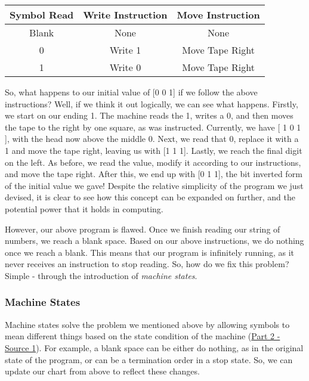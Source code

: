 \documentclass{article}
\begin{document}
\begin{center}
\begin{tabular}{||c c c||} 
 \hline
 Symbol Read & Write Instruction & Move Instruction\\ [0.5ex] 
 \hline\hline
 Blank & None & None\\ 
 \hline
 0 & Write 1 & Move Tape Right\\
 \hline
 1 & Write 0 & Move Tape Right\\
 \hline
\end{tabular}
\end{center}

\medskip\noindent So, what happens to our initial value of [0 0 1] if we follow the above instructions? Well, if we think it out logically, we can see what happens. Firstly, we start on our ending 1. The machine reads the 1, writes a 0, and then moves the tape to the right by one square, as was instructed. Currently, we have [ 1 0 1 ], with the head now above the middle 0. Next, we read that 0, replace it with a 1 and move the tape right, leaving us with [1 1 1]. Lastly, we reach the final digit on the left. As before, we read the value, modify it according to our instructions, and move the tape right. After this, we end up with [0 1 1], the bit inverted form of the initial value we gave! Despite the relative simplicity of the program we just devised, it is clear to see how this concept can be expanded on further, and the potential power that it holds in computing.

\medskip\noindent However, our above program is flawed. Once we finish reading our string of numbers, we reach a blank space. Based on our above instructions, we do nothing once we reach a blank. This means that our program is infinitely running, as it never receives an instruction to stop reading. So, how do we fix this problem? Simple - through the introduction of \textit{machine states}. 

    \subsubsection{Machine States}
    \medskip\noindent Machine states solve the problem we mentioned above by allowing symbols to mean different things based on the state condition of the machine (\href {https://www.cl.cam.ac.uk/projects/raspberrypi/tutorials/turing-machine/one.html}{Part 2 - Source 1}). For example, a blank space can be either do nothing, as in the original state of the program, or can be a termination order in a stop state. So, we can update our chart from above to reflect these changes. 
    
\end{document}
